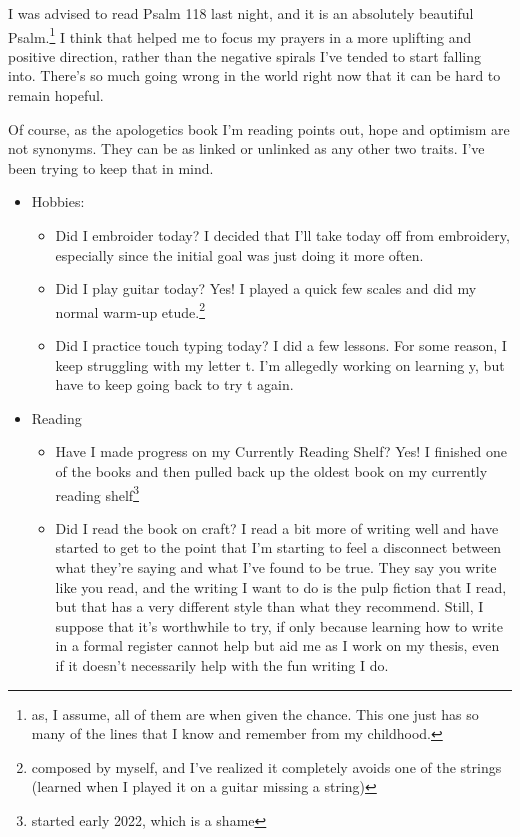 \documentclass[12pt]{article}[titlepage]
\newcommand{\1}{\={a}}
\newcommand{\2}{\={e}}
\newcommand{\3}{\={\i}}
\newcommand{\4}{\=o}
\newcommand{\5}{\=u}
\newcommand{\6}{\={A}}
\renewcommand{\,}{\textsuperscript{,}}
\begin{document}
I was advised to read Psalm 118 last night, and it is an absolutely beautiful Psalm.\footnote{as, I assume, all of them are when given the chance.
This one just has so many of the lines that I know and remember from my childhood.}
I think that helped me to focus my prayers in a more uplifting and positive direction, rather than the negative spirals I've tended to start falling into.
There's so much going wrong in the world right now that it can be hard to remain hopeful.
 
Of course, as the apologetics book I'm reading points out, hope and optimism are not synonyms.
They can be as linked or unlinked as any other two traits.
I've been trying to keep that in mind. 
 
\begin{itemize}
\item Hobbies:
\begin{itemize}
\item Did I embroider today? I decided that I'll take today off from embroidery, especially since the initial goal was just doing it more often. 
\item Did I play guitar today? Yes! I played a quick few scales and did my normal warm-up etude.\footnote{composed by myself, and I've realized it completely avoids one of the strings (learned when I played it on a guitar missing a string)} 
\item Did I practice touch typing today? I did a few lessons. For some reason, I keep struggling with my letter t. I'm allegedly working on learning y, but have to keep going back to try t again. 
\end{itemize}
\item Reading
\begin{itemize}
\item Have I made progress on my Currently Reading Shelf? Yes! I finished one of the books and then pulled back up the oldest book on my currently reading shelf\footnote{started early 2022, which is a shame} 
\item Did I read the book on craft? I read a bit more of writing well and have started to get to the point that I'm starting to feel a disconnect between what they're saying and what I've found to be true.
They say you write like you read, and the writing I want to do is the pulp fiction that I read, but that has a very different style than what they recommend.
Still, I suppose that it's worthwhile to try, if only because learning how to write in a formal register cannot help but aid me as I work on my thesis, even if it doesn't necessarily help with the fun writing I do. 

\end{itemize}
\end{itemize}
\end{document}
